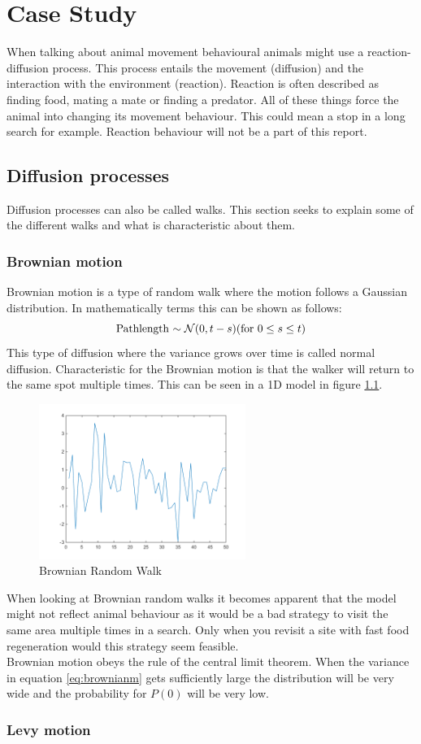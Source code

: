 \chapter{Case Study}
When talking about animal movement behavioural animals might use a reaction-diffusion process. This process entails the movement (diffusion) and the interaction with the environment (reaction). Reaction is often described as finding food, mating a mate or finding a predator. All of these things force the animal into changing its movement behaviour. This could mean a stop in a long search for example. Reaction behaviour will not be a part of this report.

\section{Diffusion processes}
Diffusion processes can also be called walks. This section seeks to explain some of the different walks and what is characteristic about them.

\subsection{Brownian motion}
Brownian motion is a type of random walk where the motion follows a Gaussian distribution. In mathematically terms this can be shown as follows:
\begin{equation}
$Pathlength $ \sim \mathcal{N}(0,t-s) ($for $ 0 \leq s \leq t)
\label{eq:brownianm}
\end{equation}
This type of diffusion where the variance grows over time is called normal diffusion. Characteristic for the Brownian motion is that the walker will return to the same spot multiple times. This can be seen in a 1D model in figure \ref{fig:brownianrw}.
\begin{figure}[H]
\centering
\includegraphics[width = 0.6\textwidth]{billeder/brownian}
\caption{Brownian Random Walk}
\label{fig:brownianrw}
\end{figure}
When looking at Brownian random walks it becomes apparent that the model might not reflect animal behaviour as it would be a bad strategy to visit the same area multiple times in a search. Only when you revisit a site with fast food regeneration would this strategy seem feasible.\\
Brownian motion obeys the rule of the central limit theorem. When the variance in equation \ref{eq:brownianm} gets sufficiently large the distribution will be very wide and the probability for $P(0)$ will be very low.

\subsection{Levy motion}